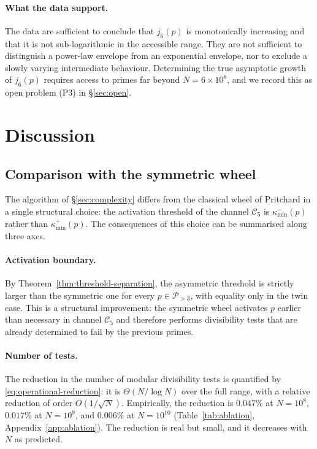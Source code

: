 \documentclass[11pt]{amsart}
\numberwithin{equation}{section}
\newcommand{\cP}{\mathcal{P}}
\newcommand{\kminp}{\kappa_{\min}^{+}}
\newcommand{\kminm}{\kappa_{\min}^{-}}
\newcommand{\Cfive}{\mathcal{C}_5}
\theoremstyle{plain}
\theoremstyle{definition}
\begin{document}
\paragraph{What the data support.}
The data are sufficient to conclude that $j_6(p)$ is monotonically
increasing and that it is not sub-logarithmic in the accessible
range. They are not sufficient to distinguish a power-law envelope
from an exponential envelope, nor to exclude a slowly varying
intermediate behaviour. Determining the true asymptotic growth of
$j_6(p)$ requires access to primes far beyond $N=6\times 10^8$, and we
record this as open problem (P3) in \S\ref{sec:open}.

\section{Discussion}
\label{sec:discussion}

\subsection{Comparison with the symmetric wheel}
\label{subsec:comparison}

The algorithm of \S\ref{sec:complexity} differs from the classical
wheel of Pritchard in a single structural choice: the activation
threshold of the channel $\Cfive$ is $\kminm(p)$ rather than
$\kminp(p)$. The consequences of this choice can be summarised along
three axes.

\paragraph{Activation boundary.} By
Theorem~\ref{thm:threshold-separation}, the asymmetric threshold is
strictly larger than the symmetric one for every $p\in\cP_{>3}$, with
equality only in the twin case. This is a structural improvement: the
symmetric wheel activates $p$ earlier than necessary in channel
$\Cfive$ and therefore performs divisibility tests that are already
determined to fail by the previous primes.

\paragraph{Number of tests.} The reduction in the number of modular
divisibility tests is quantified by \eqref{eq:operational-reduction}:
it is $\Theta(N/\log N)$ over the full range, with a relative
reduction of order $O(1/\sqrt{N})$. Empirically, the reduction is
$0.047\%$ at $N=10^8$, $0.017\%$ at $N=10^9$, and $0.006\%$ at
$N=10^{10}$ (Table~\ref{tab:ablation}, Appendix~\ref{app:ablation}).
The reduction is real but small, and it decreases with $N$ as
predicted.
\end{document}
